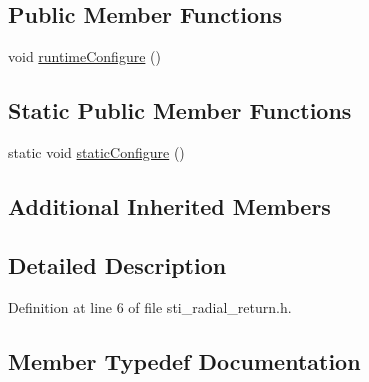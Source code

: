 \subsection*{Public Member Functions}
\begin{DoxyCompactItemize}
\item 
void \hyperlink{structsm__dance__bot__strikes__back_1_1radial__motion__states_1_1StiRadialReturn_ab9c47147170a78be6f81dbc6127fa0d8}{runtime\+Configure} ()
\end{DoxyCompactItemize}
\subsection*{Static Public Member Functions}
\begin{DoxyCompactItemize}
\item 
static void \hyperlink{structsm__dance__bot__strikes__back_1_1radial__motion__states_1_1StiRadialReturn_ab6a28934e740e83fd282f8a27204a080}{static\+Configure} ()
\end{DoxyCompactItemize}
\subsection*{Additional Inherited Members}


\subsection{Detailed Description}


Definition at line 6 of file sti\+\_\+radial\+\_\+return.\+h.



\subsection{Member Typedef Documentation}
\mbox{\label{structsm__dance__bot__strikes__back_1_1radial__motion__states_1_1StiRadialReturn_a5f99f31252e2cbcafad66ec9e9f8b91d}} 
